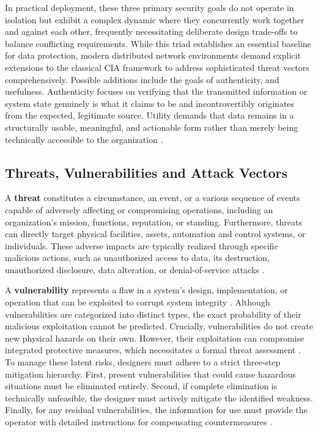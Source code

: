 In practical deployment, these three primary security goals do not operate in isolation but exhibit a complex dynamic where they concurrently work together and against each other, frequently necessitating deliberate design trade-offs to balance conflicting requirements. While this triad establishes an essential baseline for data protection, modern distributed network environments demand explicit extensions to the classical CIA framework to address sophisticated threat vectors comprehensively. Possible additions include the goals of authenticity, and usefulness. Authenticity focuses on verifying that the transmitted information or system state genuinely is what it claims to be and incontrovertibly originates from the expected, legitimate source. Utility demands that data remains in a structurally usable, meaningful, and actionable form rather than merely being technically accessible to the organization \cite{CIAtriadEICTA2026} \cite[pp. 102]{doCarmo2025}.




\subsection{Threats, Vulnerabilities and Attack Vectors} 
\label{subsec:threats_vulnerabilities_risks} 

A \textbf{threat} constitutes a circumstance, an event, or a various sequence of events capable of adversely affecting or compromising operations, including an organization's mission, functions, reputation, or standing. Furthermore, threats can directly target physical facilities, assets, automation and control systems, or individuals. These adverse impacts are typically realized through specific malicious actions, such as unauthorized access to data, its destruction, unauthorized disclosure, data alteration, or denial-of-service attacks \cite[p. 23]{IEC62443-3-3}.


A \textbf{vulnerability} represents a flaw in a system's design, implementation, or operation that can be exploited to corrupt system integrity \cite[p. 12]{prEN50742_2025}. Although vulnerabilities are categorized into distinct types, the exact probability of their malicious exploitation cannot be predicted. Crucially, vulnerabilities do not create new physical hazards on their own. However, their exploitation can compromise integrated protective measures, which necessitates a formal threat assessment \cite[p. 9]{prEN50742_2025}. To manage these latent risks, designers must adhere to a strict three-step mitigation hierarchy. First, present vulnerabilities that could cause hazardous situations must be eliminated entirely. Second, if complete elimination is technically unfeasible, the designer must actively mitigate the identified weakness. Finally, for any residual vulnerabilities, the information for use must provide the operator with detailed instructions for compensating countermeasures \cite[p. 14]{prEN50742_2025}.

